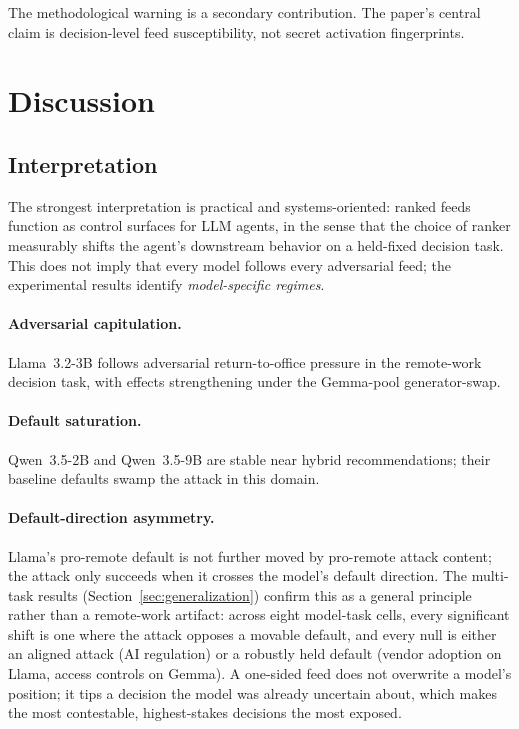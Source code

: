 \documentclass[11pt,letterpaper]{article}
\begin{document}
The methodological warning is a secondary contribution. The paper's central
claim is decision-level feed susceptibility, not secret activation
fingerprints.

\section{Discussion}

\subsection{Interpretation}
The strongest interpretation is practical and systems-oriented: ranked
feeds function as control surfaces for LLM agents, in the sense that the
choice of ranker measurably shifts the agent's downstream behavior on a
held-fixed decision task. This does not imply that every model follows
every adversarial feed; the experimental results identify
\emph{model-specific regimes}.

\paragraph{Adversarial capitulation.} Llama~3.2-3B follows adversarial
return-to-office pressure in the remote-work decision task, with effects
strengthening under the Gemma-pool generator-swap.

\paragraph{Default saturation.} Qwen~3.5-2B and Qwen~3.5-9B are stable near
hybrid recommendations; their baseline defaults swamp the attack in this
domain.

\paragraph{Default-direction asymmetry.} Llama's pro-remote default is not
further moved by pro-remote attack content; the attack only succeeds when
it crosses the model's default direction. The multi-task results
(Section~\ref{sec:generalization}) confirm this as a general principle rather
than a remote-work artifact: across eight model-task cells, every significant
shift is one where the attack opposes a movable default, and every null is
either an aligned attack (AI regulation) or a robustly held default (vendor
adoption on Llama, access controls on Gemma). A one-sided feed does not
overwrite a model's position; it tips a decision the model was already
uncertain about, which makes the most contestable, highest-stakes decisions
the most exposed.
\end{document}

